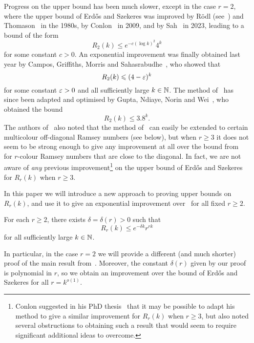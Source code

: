 Progress on the upper bound has been much slower, except in the case $r = 2$, where the upper bound of Erd\H{o}s and Szekeres was improved by R\"odl (see~\cite{GR}) and Thomason~\cite{T88} in the 1980s, by Conlon~\cite{C09} in 2009, and by Sah~\cite{S23} in 2023, leading to a bound of the form
$$R_2(k) \le e^{- c(\log k)^2} 4^k$$
for some constant $c > 0$. An exponential improvement was finally obtained last year by Campos, Griffiths, Morris and Sahasrabudhe~\cite{CGMS}, who showed that
$$R_2(k) \leqslant (4 - \varepsilon)^k$$ 
for some constant $\varepsilon > 0$ and all sufficiently large $k \in \mathbb{N}$. The method of~\cite{CGMS} has since been adapted and optimised by Gupta, Ndiaye, Norin and Wei~\cite{GNNW}, who obtained the bound
$$R_2(k) \le 3.8^k.$$ 
The authors of~\cite{GNNW} also noted that the method of~\cite{CGMS} can easily be extended to certain multicolour off-diagonal Ramsey numbers (see below), but when $r \ge 3$ it does not seem to be strong enough to give any improvement at all over the %
bound from~\cite{ESz35} for $r$-colour Ramsey numbers that are close to the diagonal. In fact, we are not aware of \emph{any} previous improvement\footnote{Conlon suggested in his PhD thesis~\cite[page~46]{CPhD} that it may be possible to adapt his method to give a similar improvement for $R_r(k)$ when $r \ge 3$, but also noted several obstructions to obtaining such a result that would seem to require significant additional ideas to overcome.} %
on the upper bound of Erd\H{o}s and Szekeres for %
$R_r(k)$ when $r \ge 3$. 

In this paper we will introduce a new approach to proving upper bounds on $R_r(k)$, and use it to give an exponential improvement over~\cite{ESz35} for all fixed $r \ge 2$. 
 
\begin{theorem}\label{thm:Ramsey:multicolour}
For each $r \ge 2$, there exists $\delta = \delta(r) > 0$ such that 
$$R_r(k) \le e^{-\delta k} r^{rk}$$ 
for all sufficiently large $k \in \mathbb{N}$. 
\end{theorem}

In particular, in the case $r = 2$ we will provide a different (and much shorter) proof of the main result from~\cite{CGMS}. Moreover, the constant $\delta(r)$ given by our proof is polynomial in $r$, so we obtain an improvement over the bound of Erd\H{o}s and Szekeres for all $r = k^{o(1)}$. 

